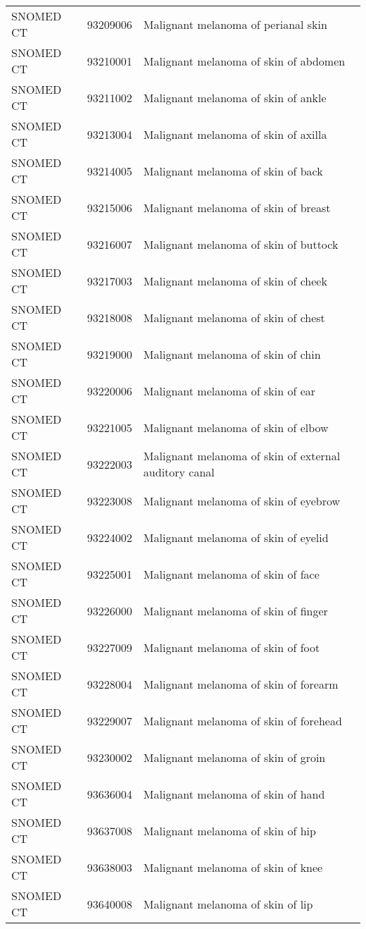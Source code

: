 \begin{longtable}{p{}p{}p{}}
  SNOMED CT & 93209006 & Malignant melanoma of perianal skin \\ 
  SNOMED CT & 93210001 & Malignant melanoma of skin of abdomen \\ 
  SNOMED CT & 93211002 & Malignant melanoma of skin of ankle \\ 
  SNOMED CT & 93213004 & Malignant melanoma of skin of axilla \\ 
  SNOMED CT & 93214005 & Malignant melanoma of skin of back \\ 
  SNOMED CT & 93215006 & Malignant melanoma of skin of breast \\ 
  SNOMED CT & 93216007 & Malignant melanoma of skin of buttock \\ 
  SNOMED CT & 93217003 & Malignant melanoma of skin of cheek \\ 
  SNOMED CT & 93218008 & Malignant melanoma of skin of chest \\ 
  SNOMED CT & 93219000 & Malignant melanoma of skin of chin \\ 
  SNOMED CT & 93220006 & Malignant melanoma of skin of ear \\ 
  SNOMED CT & 93221005 & Malignant melanoma of skin of elbow \\ 
  SNOMED CT & 93222003 & Malignant melanoma of skin of external auditory canal \\ 
  SNOMED CT & 93223008 & Malignant melanoma of skin of eyebrow \\ 
  SNOMED CT & 93224002 & Malignant melanoma of skin of eyelid \\ 
  SNOMED CT & 93225001 & Malignant melanoma of skin of face \\ 
  SNOMED CT & 93226000 & Malignant melanoma of skin of finger \\ 
  SNOMED CT & 93227009 & Malignant melanoma of skin of foot \\ 
  SNOMED CT & 93228004 & Malignant melanoma of skin of forearm \\ 
  SNOMED CT & 93229007 & Malignant melanoma of skin of forehead \\ 
  SNOMED CT & 93230002 & Malignant melanoma of skin of groin \\ 
  SNOMED CT & 93636004 & Malignant melanoma of skin of hand \\ 
  SNOMED CT & 93637008 & Malignant melanoma of skin of hip \\ 
  SNOMED CT & 93638003 & Malignant melanoma of skin of knee \\ 
  SNOMED CT & 93640008 & Malignant melanoma of skin of lip \\ 

\end{longtable}
